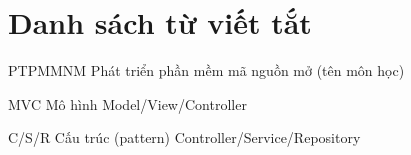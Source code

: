 \chapter*{Danh sách từ viết tắt}
\begin{abbrv}
    
    \item[PTPMMNM]			Phát triển phần mềm mã nguồn mở (tên môn học)
    \item[MVC]			    Mô hình Model/View/Controller
    \item[C/S/R]			Cấu trúc (pattern) Controller/Service/Repository
    
\end{abbrv}
